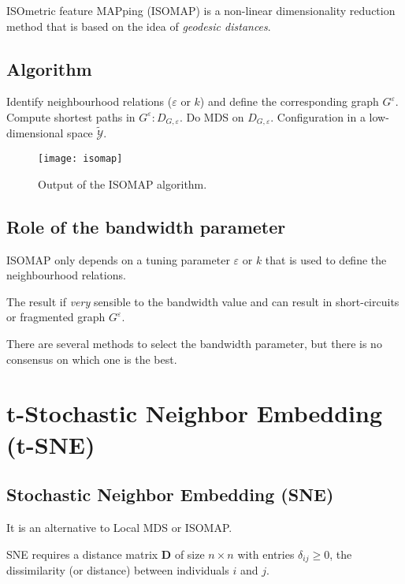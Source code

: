 ISOmetric feature MAPping (ISOMAP) is a non-linear dimensionality reduction
method that is based on the idea of \emph{geodesic distances}.

\subsection{Algorithm}
\begin{algorithmic}[1]
	 
	\State Identify neighbourhood relations ($\varepsilon$ or $k$) and define the
	corresponding graph $G^\varepsilon$.
	\State Compute shortest paths in $G^\varepsilon: D_{G,\varepsilon}$.
	\State Do MDS on $D_{G,\varepsilon}$.
	\State \Return Configuration in a low-dimensional space $\mathcal{\tilde{Y}}$.
	\EndProcedure
\end{algorithmic}

\begin{figure}[H]
	\texttt{[image: isomap]}
	\caption{Output of the ISOMAP algorithm.}
\end{figure}

\subsection{Role of the bandwidth parameter}
ISOMAP only depends on a tuning parameter $\varepsilon$ or $k$ that is used to
define the neighbourhood relations.

\begin{marker}
	The result if \emph{very} sensible to the bandwidth value and can result
	in short-circuits or fragmented graph $G^\varepsilon$.
\end{marker}

There are several methods to select the bandwidth parameter, but there
is no consensus on which one is the best.

\pagebreak
\section[t-Stochastic Neighbor Embedding]{t-Stochastic Neighbor Embedding (t-SNE)}

\subsection{Stochastic Neighbor Embedding (SNE)}
It is an alternative to Local MDS or ISOMAP.

SNE requires a distance matrix $\boldsymbol D$ of size $n \times n$ with
entries $\delta_{ij} \geq 0$, the dissimilarity (or distance) between
individuals $i$ and $j$.


